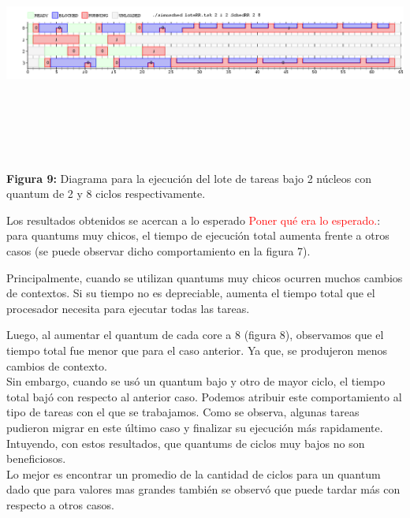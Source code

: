 \documentclass[a4paper]{article}
\begin{document}
 \includegraphics[width=\textwidth,height=3.0in,keepaspectratio]{imagenes/ej4/eje3.png} \\
\begin {flushleft}
\textbf{Figura 9:} Diagrama para la ejecuci\'on del lote de tareas bajo 2 n\'ucleos con quantum de 2 y 8 ciclos respectivamente.
\end{flushleft}

\bigskip

Los resultados obtenidos se acercan a lo esperado \textcolor{red}{Poner qu\'e era lo esperado.}: para quantums muy chicos, el tiempo de ejecución total aumenta frente a otros casos (se puede observar dicho comportamiento en la figura 7).

 Principalmente, cuando se utilizan quantums muy chicos ocurren muchos cambios de contextos. Si su tiempo no es depreciable, aumenta el tiempo total que el procesador necesita para ejecutar todas las tareas. 
 
 Luego, al aumentar el quantum de cada core a 8 (figura 8), observamos que el tiempo total fue menor que para el caso anterior. Ya que, se produjeron menos cambios de contexto. \\
 
 Sin embargo, cuando se usó un quantum bajo y otro de mayor ciclo, el tiempo total bajó con respecto al anterior caso. Podemos atribuir este comportamiento al tipo de tareas con el que se trabajamos. Como se observa, algunas tareas pudieron migrar en este último caso y finalizar su ejecución más rapidamente. Intuyendo, con estos resultados, que quantums de ciclos muy bajos no son beneficiosos.\\
 
 
  Lo mejor es encontrar un promedio de la cantidad de ciclos para un quantum dado que para valores mas grandes también se observó que puede tardar más con respecto a otros casos.   
 
\end{document}
